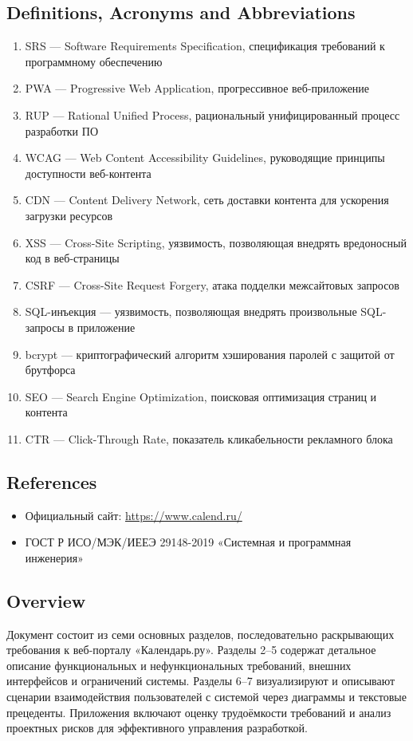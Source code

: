 \subsection{Definitions, Acronyms and Abbreviations}
\begin{enumerate}[leftmargin=*,label=\arabic*.]
    \item SRS — Software Requirements Specification, спецификация требований к программному обеспечению
    \item PWA — Progressive Web Application, прогрессивное веб-приложение
    \item RUP — Rational Unified Process, рациональный унифицированный процесс разработки ПО
    \item WCAG — Web Content Accessibility Guidelines, руководящие принципы доступности веб-контента
    \item CDN — Content Delivery Network, сеть доставки контента для ускорения загрузки ресурсов
    \item XSS — Cross-Site Scripting, уязвимость, позволяющая внедрять вредоносный код в веб-страницы
    \item CSRF — Cross-Site Request Forgery, атака подделки межсайтовых запросов
    \item SQL-инъекция — уязвимость, позволяющая внедрять произвольные SQL-запросы в приложение
    \item bcrypt — криптографический алгоритм хэширования паролей с защитой от брутфорса
    \item SEO — Search Engine Optimization, поисковая оптимизация страниц и контента
    \item CTR — Click-Through Rate, показатель кликабельности рекламного блока
\end{enumerate}


\subsection{References}
\begin{itemize}[leftmargin=*]
    \item Официальный сайт: \url{https://www.calend.ru/}
    \item ГОСТ Р ИСО/МЭК/ИЕЕЭ 29148-2019 «Системная и программная инженерия»
\end{itemize}

\subsection{Overview}
Документ состоит из семи основных разделов, последовательно раскрывающих
требования к веб-порталу «Календарь.ру». Разделы 2–5 содержат детальное
описание функциональных и нефункциональных требований, внешних интерфейсов
и ограничений системы. Разделы 6–7 визуализируют и описывают сценарии
взаимодействия пользователей с системой через диаграммы и текстовые
прецеденты. Приложения включают оценку трудоёмкости требований и анализ
проектных рисков для эффективного управления разработкой.

